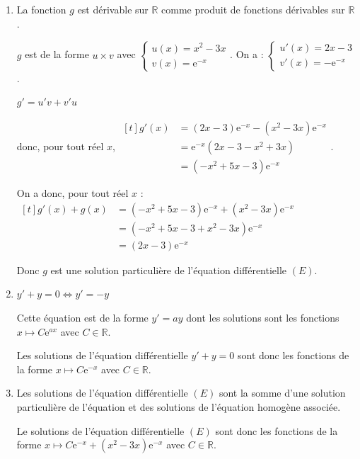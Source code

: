 \documentclass[10pt]{article}
\providecommand{\R}{\mathbb{R}}
\providecommand{\e}{{\mathrm{e}}}
\begin{document}
	\begin{enumerate}
		\item La fonction $g$ est dérivable sur $\R$ comme produit de fonctions dérivables sur $\R$.

		$g$ est de la forme $u\times v$ avec $\begin{cases}u(x) = x^2-3x \\ v(x) =\e^{-x}  \end{cases}$. On a : $\begin{cases}u'(x) = 2x-3 \\ v'(x) =-\e^{-x}  \end{cases}$.

		$g'= u'v + v'u$

		donc, pour tout réel $x$, $\begin{aligned}[t] g'(x) &= (2x-3) \e^{-x}  - (x^2-3x) \e^{-x} \\
			&= \e^{-x} \left( 2x-3-x^2+3x\right) \\
			&= \left( -x^2 + 5x-3\right) \e^{-x}
		\end{aligned}$.

		On a donc, pour tout réel $x$ : $\begin{aligned}[t] g'(x) + g(x) & = \left( -x^2 + 5x-3\right) \e^{-x} + \left( x^2 - 3x\right) \e^{-x}\\
			&= \left( -x^2 + 5x-3 +  x^2 - 3x\right) \e^{-x}\\
			&= \left(  2x-3 \right) \e^{-x}
		\end{aligned}$

		Donc $g$ est une solution particulière de l'équation différentielle  $(E)$.

		\item  $y' + y =0 \iff  y'= -y$

		Cette équation est de la forme $y'=ay$ dont les solutions sont les fonctions $x \mapsto C \e^{ax}$ avec $C\in \R$.



		Les solutions de l'équation différentielle \quad $y'+y=0$ sont donc les fonctions de la forme $x \mapsto C\e^{-x}$ avec $C \in \R$.

		\item Les solutions de l'équation différentielle $(E)$ sont la somme d'une solution particulière de l'équation et des solutions de l'équation homogène associée.

		Le solutions de l'équation différentielle $(E)$ sont donc les fonctions de la forme $x \mapsto C\e^{-x} +\left(  x^2- 3x \right) \e^{-x}$ avec $C\in \R$.


\end{enumerate}
\end{document}
